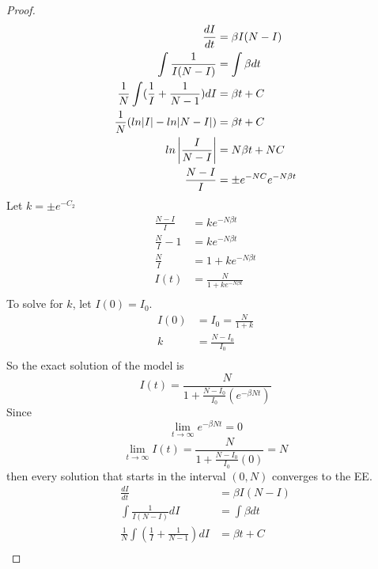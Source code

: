  \begin{proof}
    \begin{align*}
        \frac{dI}{dt}                                   &= \beta I(N-I)\\
        \int\frac{1}{I(N-I)}                            &= \int\beta dt\\
        \frac{1}{N}\int (\frac{1}{I} + \frac{1}{N-1})dI &= \beta t + C\\
        \frac{1}{N}(ln|I|- ln|N-I|)                     &= \beta t + C\\
        ln\left|\frac{I}{N-I}\right|                           &= N \beta t + NC\\
        \frac{N-I}{I}                                   &= \pm e^{-NC}e^{-N\beta t}\\
    \end{align*}
    Let $k = \pm e^{-C_2}$\\
    \begin{align*}
        \frac{N-I}{I} 	  &= ke^{-N\beta t}\\
        \frac{N}{I} - 1   &= ke^{-N\beta t}\\
        \frac{N}{I} 	  &= 1 + ke^{-N\beta t}\\
        I(t) 			  &= \frac{N}{1 + ke^{-N\beta t}}\\
    \end{align*}
    To solve for $k$, let $I(0) = I_0$.\\
    \begin{align*}
        I(0) 	&= I_0 = \frac{N}{1 + k}\\
        k 		&= \frac{N - I_0}{I_0}\\
    \end{align*}
    So the exact solution of the model is
    \begin{equation}
        I(t) =  \frac{N}{1+\frac{N-I_0}{I_0}(e^{-\beta N t})}
    \end{equation}
    Since
    $$\lim_{t\to\infty} e^{-\beta N t} = 0$$
    $$\lim_{t\to\infty} I(t) = \frac{N}{1 +\frac{N-I_0}{I_0}(0)} = N$$
    then every solution that starts in the interval $(0, N)$ converges to the EE.
    \begin{align*}
        \frac{dI}{dt}                                   &= \beta I(N-I)\\
        \int\frac{1}{I(N-I)} dI                         &= \int\beta dt\\
        \frac{1}{N}\int (\frac{1}{I} + \frac{1}{N-1})dI &= \beta t + C\\

\end{align*}
\end{proof}
